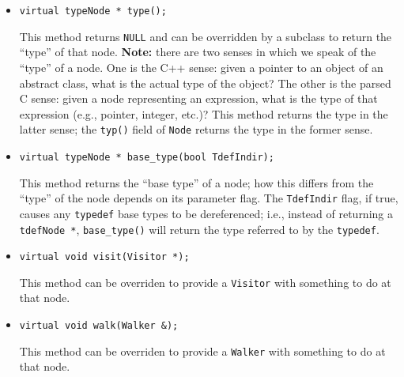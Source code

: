 \documentclass[10pt]{article}
\begin{document}
\begin{itemize}

\item
\begin{small}
\begin{verbatim}
virtual typeNode * type();
\end{verbatim}
\end{small}

This method returns {\tt NULL} and can be overridden by a subclass to return
the ``type'' of that node.  {\bf Note:} there are two senses in which we
speak of the ``type'' of a node.  One is the C++ sense:  given a pointer to
an object of an abstract class, what is the actual type of the object?  The
other is the parsed C sense: given a node representing an expression, what is
the type of that expression (e.g., pointer, integer, etc.)?  This method
returns the type in the latter sense; the {\tt typ()} field of {\tt Node}
returns the type in the former sense.

\item
\begin{small}
\begin{verbatim}
virtual typeNode * base_type(bool TdefIndir);
\end{verbatim}
\end{small}

This method returns the ``base type'' of a node; how this differs from the
``type'' of the node depends on its parameter flag.  The {\tt TdefIndir}
flag, if true, causes any {\tt typedef} base types to be dereferenced; i.e.,
instead of returning a {\tt tdefNode *}, {\tt base\_type()} will return the
type referred to by the {\tt typedef}.

\item
\begin{small}
\begin{verbatim}
virtual void visit(Visitor *);
\end{verbatim}
\end{small}

This method can be overriden to provide a {\tt Visitor} with something to do
at that node.

\item
\begin{small}
\begin{verbatim}
virtual void walk(Walker &);
\end{verbatim}
\end{small}

This method can be overriden to provide a {\tt Walker} with something to do
at that node.


\end{itemize}
\end{document}
